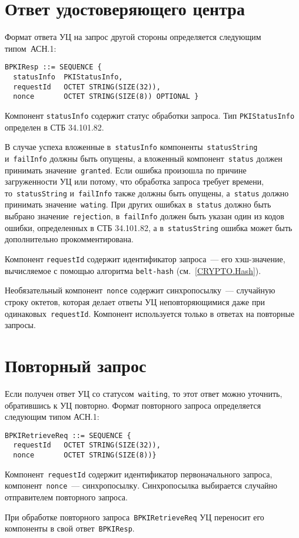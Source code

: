\section{Ответ удостоверяющего центра}\label{FMT.BPKIResp}

Формат ответа УЦ на запрос другой стороны определяется следующим типом~АСН.1:
\begin{verbatim}
BPKIResp ::= SEQUENCE { 
  statusInfo  PKIStatusInfo,
  requestId   OCTET STRING(SIZE(32)),
  nonce       OCTET STRING(SIZE(8)) OPTIONAL }
\end{verbatim}

Компонент \texttt{statusInfo} содержит статус обработки запроса.
Тип \texttt{PKIStatusInfo} определен в СТБ 34.101.82. 

В случае успеха вложенные в~\texttt{statusInfo} 
компоненты~\texttt{statusString} 
и~\texttt{failInfo} должны быть опущены, а вложенный
компонент~\texttt{status} должен принимать значение~\texttt{granted}.
%
Если ошибка произошла по причине загруженности УЦ или потому, 
что обработка запроса требует времени, 
то~\texttt{statusString} и~\texttt{failInfo} также должны быть опущены, 
а~\texttt{status} должно принимать значение~\texttt{wating}.
%
При других ошибках в~\texttt{status} должно быть выбрано 
значение~\texttt{rejection}, в~\texttt{failInfo} должен быть указан один 
из кодов ошибки, определенных в СТБ 34.101.82, а в~\texttt{statusString} 
ошибка может быть дополнительно прокомментирована.

Компонент \texttt{requestId} содержит идентификатор запроса~--- 
его хэш-значение, вычисляемое с помощью алгоритма \texttt{belt-hash} 
(см.~\ref{CRYPTO.Hash}). 

Необязательный компонент~\texttt{nonce} содержит синхропосылку~---
случайную строку октетов, которая делает ответы УЦ неповторяющимися даже 
при одинаковых~\texttt{requestId}. Компонент используется только в ответах
на повторные запросы.

\section{Повторный запрос}\label{FMT.BPKIRetrieveReq}

Если получен ответ УЦ со статусом~\texttt{waiting}, то этот ответ можно 
уточнить, обратившись к УЦ повторно. Формат повторного запроса 
определяется следующим типом АСН.1:
\begin{verbatim}
BPKIRetrieveReq ::= SEQUENCE { 
  requestId   OCTET STRING(SIZE(32)),
  nonce       OCTET STRING(SIZE(8))}
\end{verbatim}

Компонент~\texttt{requestId} содержит идентификатор первоначального 
запроса, компонент~\texttt{nonce}~--- синхропосылку. Синхропосылка 
выбирается случайно отправителем повторного запроса. 

При обработке повторного запроса~\texttt{BPKIRetrieveReq} УЦ
переносит его компоненты в свой ответ~\texttt{BPKIResp}.

